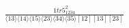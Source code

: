 \documentclass[varwidth, border=5pt]{standalone}
\begin{document}
\begin{my}
$\begin{gathered}
\scriptscriptstyle\frac{1tr5_{1234}^2}{⟨13⟩⟨14⟩⟨15⟩⟨23⟩⟨34⟩⟨35⟩[12][13][23]}
\end{gathered}$
\end{my}
\end{document}
